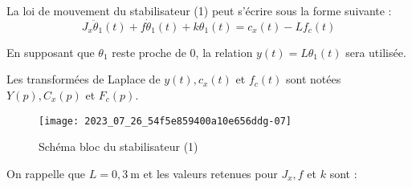 %
%
%
%



La loi de mouvement du stabilisateur (1) peut s'écrire sous la forme suivante :
$$
J_{x} \ddot{\theta}_{1}(t)+f \dot{\theta}_{1}(t)+k \theta_{1}(t)=c_{x}(t)-L f_{c}(t)
$$

En supposant que $\theta_{1}$ reste proche de 0, la relation $y(t)=L \theta_{1}(t)$ sera utilisée.

Les transformées de Laplace de $y(t), c_{x}(t)$ et $f_{c}(t)$ sont notées $Y(p), C_{x}(p)$ et $F_{c}(p)$.



\begin{figure}[!h]
\centering
\texttt{[image: 2023\_07\_26\_54f5e859400a10e656ddg-07]}
\caption{\label{fig_ccspsi2022:10}Schéma bloc du stabilisateur (1)}
\end{figure}

On rappelle que $L=0,3 \mathrm{~m}$ et les valeurs retenues pour $J_{x}, f$ et $k$ sont :

